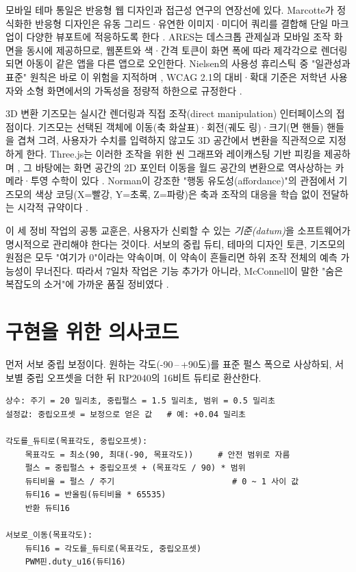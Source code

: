 모바일 테마 통일은 반응형 웹 디자인과 접근성 연구의 연장선에 있다. Marcotte가 정식화한 반응형 디자인은 유동 그리드·유연한 이미지·미디어 쿼리를 결합해 단일 마크업이 다양한 뷰포트에 적응하도록 한다 \cite{marcotte2010responsive}. ARES는 데스크톱 관제실과 모바일 조작 화면을 동시에 제공하므로, 웹폰트와 색·간격 토큰이 화면 폭에 따라 제각각으로 렌더링되면 아동이 같은 앱을 다른 앱으로 오인한다. Nielsen의 사용성 휴리스틱 중 "일관성과 표준" 원칙은 바로 이 위험을 지적하며 \cite{nielsen1994heuristics}, WCAG 2.1의 대비·확대 기준은 저학년 사용자와 소형 화면에서의 가독성을 정량적 하한으로 규정한다 \cite{wcag21}.

3D 변환 기즈모는 실시간 렌더링과 직접 조작(direct manipulation) 인터페이스의 접점이다. 기즈모는 선택된 객체에 이동(축 화살표)·회전(궤도 링)·크기(면 핸들) 핸들을 겹쳐 그려, 사용자가 수치를 입력하지 않고도 3D 공간에서 변환을 직관적으로 지정하게 한다. Three.js는 이러한 조작을 위한 씬 그래프와 레이캐스팅 기반 피킹을 제공하며 \cite{threejs}, 그 바탕에는 화면 공간의 2D 포인터 이동을 월드 공간의 변환으로 역사상하는 카메라·투영 수학이 있다 \cite{akenine2018realtime}. Norman이 강조한 "행동 유도성(affordance)"의 관점에서 기즈모의 색상 코딩(X=빨강, Y=초록, Z=파랑)은 축과 조작의 대응을 학습 없이 전달하는 시각적 규약이다 \cite{norman2013design}.

이 세 정비 작업의 공통 교훈은, 사용자가 신뢰할 수 있는 \emph{기준(datum)}을 소프트웨어가 명시적으로 관리해야 한다는 것이다. 서보의 중립 듀티, 테마의 디자인 토큰, 기즈모의 원점은 모두 "여기가 0"이라는 약속이며, 이 약속이 흔들리면 하위 조작 전체의 예측 가능성이 무너진다. 따라서 7일차 작업은 기능 추가가 아니라, McConnell이 말한 "숨은 복잡도의 소거"에 가까운 품질 정비였다 \cite{mcconnell2004codecomplete}.

\section{구현을 위한 의사코드}

먼저 서보 중립 보정이다. 원하는 각도(-90\,--\,+90도)를 표준 펄스 폭으로 사상하되, 서보별 중립 오프셋을 더한 뒤 RP2040의 16비트 듀티로 환산한다.

\begin{verbatim}
상수: 주기 = 20 밀리초, 중립펄스 = 1.5 밀리초, 범위 = 0.5 밀리초
설정값: 중립오프셋 = 보정으로 얻은 값   # 예: +0.04 밀리초

각도를_듀티로(목표각도, 중립오프셋):
    목표각도 = 최소(90, 최대(-90, 목표각도))     # 안전 범위로 자름
    펄스 = 중립펄스 + 중립오프셋 + (목표각도 / 90) * 범위
    듀티비율 = 펄스 / 주기                        # 0 ~ 1 사이 값
    듀티16 = 반올림(듀티비율 * 65535)
    반환 듀티16

서보로_이동(목표각도):
    듀티16 = 각도를_듀티로(목표각도, 중립오프셋)
    PWM핀.duty_u16(듀티16)
\end{verbatim}

